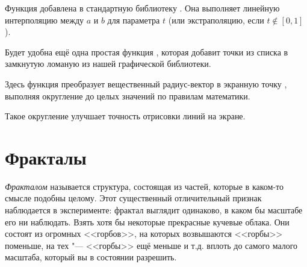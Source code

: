 
Функция  добавлена в стандартную библиотеку . Она выполняет линейную интерполяцию между \(a\) и \(b\) для параметра \(t\) (или экстраполяцию, если \(t \notin [0, 1]\)).


Будет удобна ещё одна простая функция , которая добавит точки из списка в замкнутую ломаную  из нашей графической библиотеки.


\noindent Здесь функция  преобразует вещественный радиус-вектор  в экранную точку , выполняя округление до целых значений по правилам математики.


\noindent Такое округление улучшает точность отрисовки линий на экране.



\section{Фракталы}
\emph{Фракталом} называется структура, состоящая из частей, которые в каком-то смысле подобны целому. Этот существенный отличительный признак наблюдается в эксперименте: фрактал выглядит одинаково, в каком бы масштабе его ни наблюдать. Взять хотя бы некоторые прекрасные кучевые облака. Они состоят из огромных <<горбов>>, на которых возвышаются <<горбы>> поменьше, на тех "--- <<горбы>> ещё меньше и т.д. вплоть до самого малого масштаба, который вы в состоянии разрешить.

